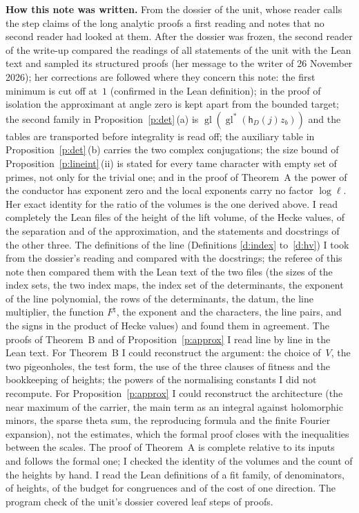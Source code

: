 \documentclass[11pt,a4paper]{article}
\newcommand{\m}[1]{\mbox{$#1$}}        %
\newcommand{\subhead}[1]{\par\addvspace{9pt plus 2pt}\Needspace{4\baselineskip}\noindent\textbf{#1}\enspace\ignorespaces}
\theoremstyle{plainx}
\theoremstyle{uprightx}
\begin{document}
\subhead{How this note was written.} From the dossier of the unit, whose reader calls the step claims of the long
analytic proofs a first reading and notes that no second reader had looked at them. After the dossier was frozen, the second reader of the write-up compared the readings of all statements of the unit
with the Lean text and sampled its structured proofs (her message to the writer of 26 November 2026); her
corrections are followed where they concern this note: the first minimum is cut off at~$1$ (confirmed in the Lean
definition); in the proof of isolation the approximant at angle zero is kept apart from the bounded target; the
second family in Proposition~\ref{p:det}\,(a) is \m{\operatorname{gl}(\operatorname{gl}^{*}(\mathsf{h}_D(j)z_b))} and the tables are
transported before integrality is read off; the auxiliary table in Proposition~\ref{p:det}\,(b) carries the two complex
conjugations; the size bound of Proposition~\ref{p:lineint}\,(ii) is stated for every tame character with empty set of
primes, not only for the trivial one; and in the proof of Theorem~A the power of the conductor has exponent zero
and the local exponents carry no factor \m{\log\ell}. Her exact identity for the ratio of the volumes is the one
derived above. I read completely the Lean
files of the height of the lift volume, of the Hecke values, of the separation and of the approximation, and the
statements and docstrings of the other three. The definitions of the line (Definitions \ref{d:index}
to~\ref{d:hv}) I took from the dossier's reading and compared with the docstrings; the referee of this note then
compared them with the Lean text of the two files (the sizes of the index sets, the two index maps, the index set
of the determinants, the exponent of the line polynomial, the rows of the determinants, the datum, the line
multiplier, the function \m{F^{\natural}}, the exponent and the characters, the line pairs, and the signs in the
product of Hecke values) and found them in agreement. The proofs of Theorem~B and of Proposition~\ref{p:approx} I read line by line in
the Lean text. For Theorem~B I could reconstruct the argument: the choice of~$V$, the two pigeonholes, the test
form, the use of the three clauses of fitness and the bookkeeping of heights; the powers of the normalising
constants I did not recompute. For Proposition~\ref{p:approx} I could reconstruct the architecture (the near maximum
of the carrier, the main term as an integral against holomorphic minors, the sparse theta sum, the reproducing
formula and the finite Fourier expansion), not the estimates, which the formal proof closes with the inequalities
between the scales. The proof of Theorem~A is complete relative to its inputs and follows the formal one; I
checked the identity of the volumes and the count of the heights by hand. I read the Lean definitions of a fit
family, of denominators, of heights, of the budget for congruences and of the cost of one direction. The program
check of the unit's dossier covered \UnitSteps{} leaf steps of \UnitProofs{} proofs.
\end{document}
